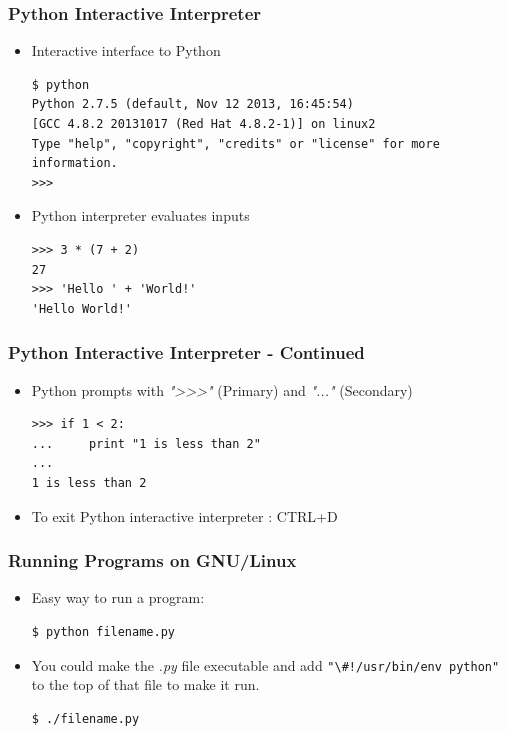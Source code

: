 \documentclass[12pt,handout]{beamer}
\newcommand{\code}[1]{\lstinline{#1}}
\begin{document}
\begin{frame}[fragile]
\frametitle{Python Interactive Interpreter}

\begin{itemize}

\item{Interactive interface to Python

\small{
\begin{verbatim}
$ python
Python 2.7.5 (default, Nov 12 2013, 16:45:54)
[GCC 4.8.2 20131017 (Red Hat 4.8.2-1)] on linux2
Type "help", "copyright", "credits" or "license" for more information.
>>>
\end{verbatim}
}
}

\item{Python interpreter evaluates inputs

\small{
\begin{verbatim}
>>> 3 * (7 + 2)
27
>>> 'Hello ' + 'World!'
'Hello World!'
\end{verbatim}
}
}
\end{itemize}
\end{frame}

\begin{frame}[fragile]
\frametitle{Python Interactive Interpreter - Continued}

\begin{itemize}

\item{Python prompts with {\it ">>>"} (Primary) and {\it "..."} (Secondary)

\small{
\begin{verbatim}
>>> if 1 < 2:
...     print "1 is less than 2"
...
1 is less than 2
\end{verbatim}
}
}

\item To exit Python interactive interpreter :  CTRL+D

\end{itemize}
\end{frame}

\begin{frame}[fragile]
\frametitle{Running Programs on GNU/Linux}

\begin{itemize}
\item Easy way to run a program:

\small{
\begin{verbatim}
$ python filename.py
\end{verbatim}
}

\item You could make the {\it *.py} file executable and add
  \code{"\#!/usr/bin/env python"} to the top of that file to make it
  run.

\small{
\begin{verbatim}
$ ./filename.py
\end{verbatim}
}

\end{itemize}

\end{frame}
\end{document}
